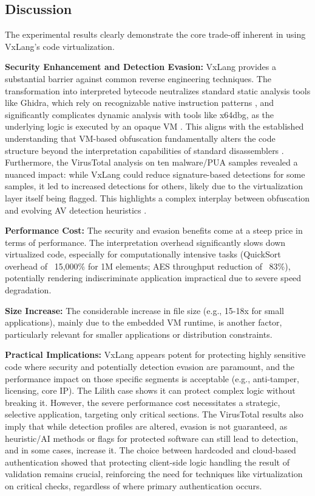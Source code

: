 \subsection{Discussion}
The experimental results clearly demonstrate the core trade-off inherent in using VxLang's code virtualization.

\textbf{Security Enhancement and Detection Evasion:} VxLang provides a substantial barrier against common reverse engineering techniques. The transformation into interpreted bytecode neutralizes standard static analysis tools like Ghidra, which rely on recognizable native instruction patterns \cite{Eilam2011, Ko2007}, and significantly complicates dynamic analysis with tools like x64dbg, as the underlying logic is executed by an opaque VM \cite{Sikorski2012}. This aligns with the established understanding that VM-based obfuscation fundamentally alters the code structure beyond the interpretation capabilities of standard disassemblers \cite{Ore06, Sal18}. Furthermore, the VirusTotal analysis on ten malware/PUA samples revealed a nuanced impact: while VxLang could reduce signature-based detections for some samples, it led to increased detections for others, likely due to the virtualization layer itself being flagged. This highlights a complex interplay between obfuscation and evolving AV detection heuristics \cite{Ore06, Sal18, Rou13}.

\textbf{Performance Cost:} The security and evasion benefits come at a steep price in terms of performance. The interpretation overhead significantly slows down virtualized code, especially for computationally intensive tasks (QuickSort overhead of ~15,000\% for 1M elements; AES throughput reduction of ~83\%), potentially rendering indiscriminate application impractical due to severe speed degradation.

\textbf{Size Increase:} The considerable increase in file size (e.g., 15-18x for small applications), mainly due to the embedded VM runtime, is another factor, particularly relevant for smaller applications or distribution constraints.

\textbf{Practical Implications:} VxLang appears potent for protecting highly sensitive code where security and potentially detection evasion are paramount, and the performance impact on those specific segments is acceptable (e.g., anti-tamper, licensing, core IP). The Lilith case shows it can protect complex logic without breaking it. However, the severe performance cost necessitates a strategic, selective application, targeting only critical sections. The VirusTotal results also imply that while detection profiles are altered, evasion is not guaranteed, as heuristic/AI methods or flags for protected software can still lead to detection, and in some cases, increase it. The choice between hardcoded and cloud-based authentication showed that protecting client-side logic handling the result of validation remains crucial, reinforcing the need for techniques like virtualization on critical checks, regardless of where primary authentication occurs.
